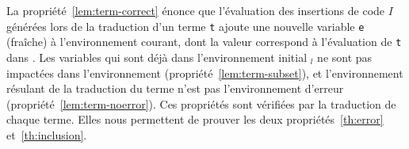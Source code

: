 La propriété~\ref{lem:term-correct} énonce que l'évaluation des insertions de
code
$I$ générées lors de la traduction d'un terme \lstinline't' ajoute une nouvelle
variable \lstinline'e' (fraîche) à l'environnement courant, dont la valeur
correspond à l'évaluation de \lstinline't' dans \env.
Les variables qui sont déjà dans l'environnement initial \env$_l$ ne sont pas
impactées dans l'environnement \env{} (propriété~\ref{lem:term-subset}), et
l'environnement résulant de la traduction du terme n'est pas l'environnement
d'erreur \errorenv (propriété~\ref{lem:term-noerror}).
Ces propriétés sont vérifiées par la traduction de chaque terme.
Elles nous permettent de prouver les deux propriétés~\ref{th:error}
et~\ref{th:inclusion}.













